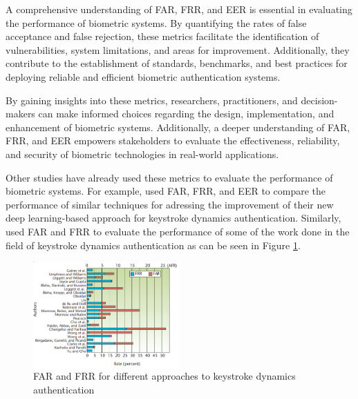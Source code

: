 A comprehensive understanding of FAR, FRR, and EER is essential in evaluating the performance of biometric systems. By quantifying the rates of false acceptance and false rejection, these metrics facilitate the identification of vulnerabilities, system limitations, and areas for improvement. Additionally, they contribute to the establishment of standards, benchmarks, and best practices for deploying reliable and efficient biometric authentication systems.

By gaining insights into these metrics, researchers, practitioners, and decision-makers can make informed choices regarding the design, implementation, and enhancement of biometric systems. Additionally, a deeper understanding of FAR, FRR, and EER empowers stakeholders to evaluate the effectiveness, reliability, and security of biometric technologies in real-world applications.

Other studies have already used these metrics to evaluate the performance of biometric systems. For example, \cite{deep_learning} used FAR, FRR, and EER to compare the performance of similar techniques for adressing the improvement of their new deep learning-based approach for keystroke dynamics authentication. Similarly, \cite{typing_patterns} used FAR and FRR to evaluate the performance of some of the work done in the field of keystroke dynamics authentication as can be seen in Figure \ref{fig:far_frr}.

\begin{figure}
    \centering
    \includegraphics[width=0.5\textwidth]{images/studies.png}
    \caption{FAR and FRR for different approaches to keystroke dynamics authentication \cite{typing_patterns}}
    \label{fig:far_frr}
\end{figure}